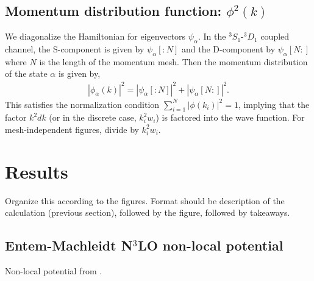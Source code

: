 \documentclass[preprintnumbers,floatfix,aps,prc,preprint,nofootinbib]{revtex4-1}
\begin{document}
\subsection{Momentum distribution function: $\phi^2(k)$}
\label{sec:momentum_dist_funcs}


We diagonalize the Hamiltonian for eigenvectors $\psi_{\alpha}$. In the $^{3}S_1$-$^{3}D_1$ coupled channel, the S-component is given by $\psi_{\alpha}[:N]$ and the D-component by $\psi_{\alpha}[N:]$ where $N$ is the length of the momentum mesh. Then the momentum distribution of the state $\alpha$ is given by,
%
\begin{eqnarray}
	\label{eq:momentum_distribution}
	|\phi_{\alpha}(k)|^2 = |\psi_{\alpha}[:N]|^2 + |\psi_{\alpha}[N:]|^2.
\end{eqnarray}
%
This satisfies the normalization condition $\sum_{i=1}^N |\phi(k_i)|^2 = 1$, implying that the factor $k^2 dk$ (or in the discrete case, $k_i^2 w_i$) is factored into the wave function. For mesh-independent figures, divide by $k_i^2 w_i$.


\section{Results}
\label{sec:results}


Organize this according to the figures. Format should be description of the calculation (previous section), followed by the figure, followed by takeaways.


\subsection{Entem-Machleidt N$^3$LO non-local potential}
\label{sec:nonlocal_results}


Non-local potential from \cite{Entem:2003ft}.
\end{document}

